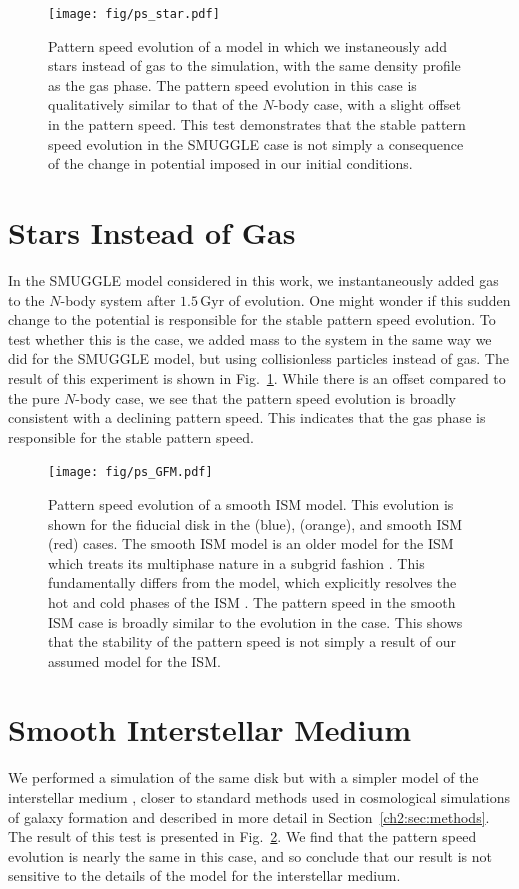\begin{appendices}
\begin{figure}
    \centering
    \texttt{[image: fig/ps\_star.pdf]}
    \caption{Pattern speed evolution of a model in which we instaneously
    add stars instead of gas to the simulation, with the same density profile as
    the gas phase. The pattern speed evolution in this case is qualitatively
    similar to that of the $N$-body case, with a slight offset in the pattern
    speed. This test demonstrates that the stable pattern speed evolution in the
    SMUGGLE case is not simply a consequence of the change in potential imposed
    in our initial conditions.}
\label{fig:ps-star}
\end{figure}

\section{Stars Instead of Gas}
In the SMUGGLE model considered in this work, we instantaneously added gas to
the $N$-body system after $1.5\,\textrm{Gyr}$ of evolution. One might wonder if
this sudden change to the potential is responsible for the stable pattern speed
evolution. To test whether this is the case, we added mass to the system in the
same way we did for the SMUGGLE model, but using collisionless particles instead
of gas. The result of this experiment is shown in Fig.~\ref{fig:ps-star}. While
there is an offset compared to the pure $N$-body case, we see that the pattern
speed evolution is broadly consistent with a declining pattern speed. This
indicates that the gas phase is responsible for the stable pattern speed.

\begin{figure}
    \centering
    \texttt{[image: fig/ps\_GFM.pdf]}
    \caption{Pattern speed evolution of a smooth ISM model. This evolution is
    shown for the fiducial disk in the \Nbody{} (blue), \SMUGGLE{} (orange), and
    smooth ISM (red) cases. The smooth ISM model is an older model for the ISM
    which treats its multiphase nature in a subgrid fashion
    \citep{2003MNRAS.339..289S}. This fundamentally differs from the \SMUGGLE{}
    model, which explicitly resolves the hot and cold phases of the ISM
    \citep{2019MNRAS.489.4233M}. The pattern speed in the smooth ISM case is
    broadly similar to the evolution in the \SMUGGLE{} case. This shows that the
    stability of the pattern speed is not simply a result of our assumed model
    for the ISM.}
\label{fig:GFM}
\end{figure}

\section{Smooth Interstellar Medium}
We performed a simulation of the same disk but with a simpler model of the
interstellar medium \citep{2003MNRAS.339..289S}, closer to standard methods used
in cosmological simulations of galaxy formation and described in more detail in
Section~\ref{ch2:sec:methods}. The result of this test is presented in
Fig.~\ref{fig:GFM}. We find that the pattern speed evolution is nearly the same
in this case, and so conclude that our result is not sensitive to the details of
the model for the interstellar medium.


\end{appendices}
